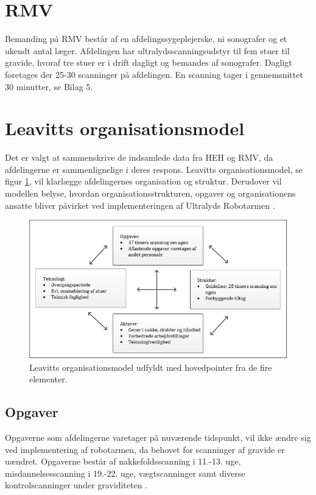 \section{RMV}
Bemanding på RMV består af en afdelingssygeplejerske, ni sonografer og et ukendt antal læger. Afdelingen har ultralydsscanningsudstyr til fem stuer til gravide, hvoraf tre stuer er i drift dagligt og bemandes af sonografer. Dagligt foretages der 25-30 scanninger på afdelingen. En scanning tager i gennemsnittet 30 minutter, se Bilag 5.

\section{Leavitts organisationsmodel}
Det er valgt at sammenskrive de indsamlede data fra HEH og RMV, da afdelingerne er sammenlignelige i deres respons. Leavitts organisationsmodel, se figur \ref{DiamantModelVores}, vil klarlægge afdelingernes organisation og struktur. Derudover vil modellen belyse, hvordan organisationsstrukturen, opgaver og organisationens ansatte bliver påvirket ved implementeringen af Ultralyds Robotarmen \cite{Leavitt}\cite{diamantmodel}.
\begin{figure}[h!]\centering
	\includegraphics[width = 1.0\textwidth]{Figurer/leavitts_udfyldt}
	\caption{Leavitts organisationsmodel udfyldt med hovedpointer fra de fire elementer.}
	\label{DiamantModelVores}
\end{figure}

\subsection{Opgaver} \label{opgaver_organisation}
Opgaverne som afdelingerne varetager på nuværende tidspunkt, vil ikke ændre sig ved implementering af robotarmen, da behovet for scanninger af gravide er uændret. Opgaverne består af nakkefoldsscanning i 11.-13. uge, misdannelsesscanning i 19.-22. uge, vægtscanninger samt diverse kontrolscanninger under graviditeten \cite{graviditet}. 

